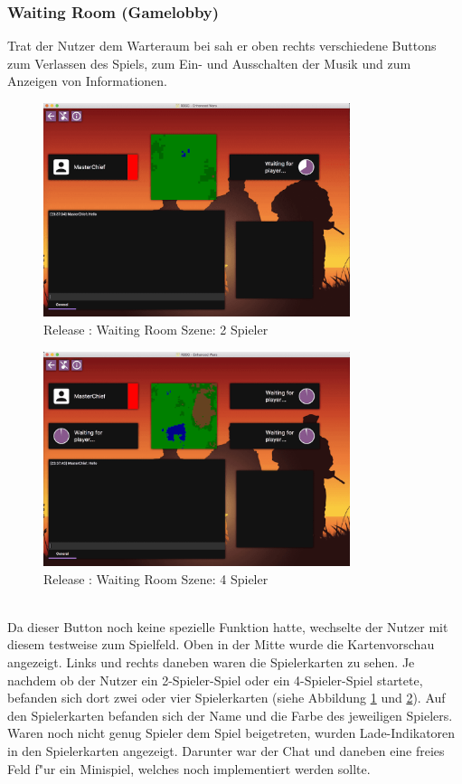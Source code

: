 \documentclass[12pt, titlepage]{scrartcl}
\newcommand{\RN}[1]{%
	\textup{\uppercase\expandafter{\romannumeral#1}}%
}
\begin{document}
	        \subsubsection{Waiting Room (Gamelobby)} \label{WAITING_ROOM}
                Trat der Nutzer dem Warteraum bei sah er oben rechts verschiedene Buttons zum Verlassen des Spiels, zum Ein- und Ausschalten der Musik und zum Anzeigen von Informationen. \\
                \begin{figure}[H] 
    				\centering
    				\includegraphics[width=0.8\textwidth]{images/old_state/waiting_room/2Player.png}
    				\caption{Release \RN{2}: Waiting Room Szene: 2 Spieler}
    				\label{Waiting_Room_2}
			    \end{figure}
			    \begin{figure}[H] 
    				\centering
    				\includegraphics[width=0.8\textwidth]{images/old_state/waiting_room/4Player.png}
    				\caption{Release \RN{2}: Waiting Room Szene: 4 Spieler}
    				\label{Waiting_Room_4}
			    \end{figure}
			    \ \\  Da dieser Button noch keine spezielle Funktion hatte, wechselte der Nutzer mit diesem testweise zum Spielfeld. Oben in der Mitte wurde die Kartenvorschau angezeigt.  Links und rechts daneben waren die Spielerkarten zu sehen. Je nachdem ob der Nutzer ein 2-Spieler-Spiel oder ein 4-Spieler-Spiel startete, befanden sich dort zwei oder vier Spielerkarten (siehe Abbildung \ref{Waiting_Room_2} und \ref{Waiting_Room_4}). Auf den Spielerkarten befanden sich der Name und die Farbe des jeweiligen Spielers. Waren noch nicht genug Spieler dem Spiel beigetreten, wurden Lade-Indikatoren in den Spielerkarten angezeigt. Darunter war der Chat und daneben eine freies Feld f"ur ein Minispiel, welches noch implementiert werden sollte.
\end{document}
